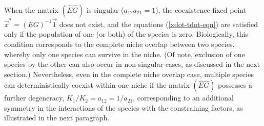 When the matrix $(\hat{E}\hat{G})$ is singular ($a_{12}a_{21}=1$), the coexistence fixed point $\vec{x}^* = (E G)^{-1}\vec{1}$ does not exist, and the equations (\ref{xdot-tdot-eqn}) are satisfied only if the population of one (or both) of the species is zero. %
Biologically, this condition corresponds to the complete niche overlap between two species, whereby only one species can survive in the niche. 
(Of note, exclusion of one species by the other can also occur in non-singular cases, as discussed in the next section.) 
Nevertheless, even in the complete niche overlap case, multiple species can deterministically coexist within one niche if the matrix $(\hat{E}\hat{G})$ possesses a further degeneracy, $K_1/K_2=a_{12}=1/a_{21}$, corresponding to an additional symmetry in the interactions of the species with the constraining factors, as illustrated in the next paragraph. %

